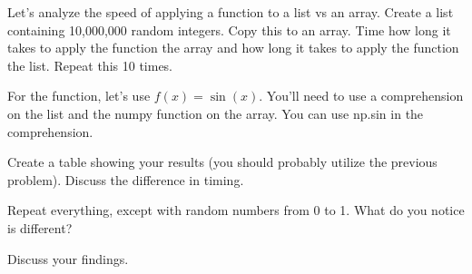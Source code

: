 \documentclass[11pt,letterpaper]{article}
\begin{document}
\begin{problem}
Let's analyze the speed of applying a function to a list vs an array. Create a list containing 10,000,000 random
integers. Copy this to an array. Time how long it takes to apply the function the array and how long it takes to
apply the function the list. Repeat this 10 times. 

For the function, let's use $f(x) = \sin(x)$. You'll need to use a comprehension on the list and the numpy function on the array. You can use np.sin in the comprehension.

Create a table showing your results (you should probably utilize the previous problem). Discuss the 
difference in timing. 

Repeat everything, except with random numbers from 0 to 1. What do you notice is different?

Discuss your findings.
\end{problem}
\end{document}
